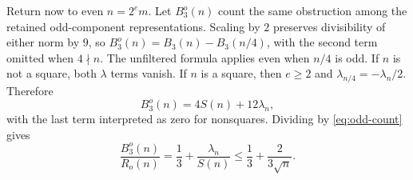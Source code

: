 Return now to even $n=2^e m$. Let $B_3^o(n)$ count the same obstruction
among the retained odd-component representations. Scaling by $2$ preserves divisibility of either norm by
$9$, so $B_3^o(n)=B_3(n)-B_3(n/4)$, with the second term omitted
when $4\nmid n$. The unfiltered formula applies even when $n/4$ is odd.
If $n$ is not a square, both
$\lambda$ terms vanish. If $n$ is a square, then $e\ge2$ and
$\lambda_{n/4}=-\lambda_n/2$. Therefore
\[
B_3^o(n)=4S(n)+12\lambda_n,
\]
with the last term interpreted as zero for nonsquares. Dividing by
\eqref{eq:odd-count} gives
\begin{equation}\label{eq:ramified-odd-bound}
\frac{B_3^o(n)}{R_o(n)}
=\frac13+\frac{\lambda_n}{S(n)}
\le\frac13+\frac{2}{3\sqrt n}.
\end{equation}
